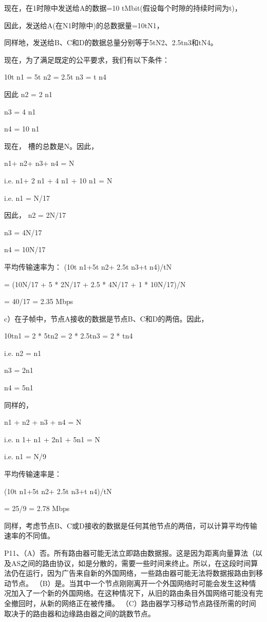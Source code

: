 \documentclass[11pt,UTF8,twoside]{article}
\begin{document}
{		现在，在1时隙中发送给A的数据=10 tMbit(假设每个时隙的持续时间为t)，
		
		因此，发送给A(在N1时隙中)的总数据量=10tN1，
		
		同样地，发送给B、C和D的数据总量分别等于5tN2、2.5tn3和tN4。
		
		现在，为了满足既定的公平要求，我们有以下条件：
		
		10t n1 = 5t n2 = 2.5t n3 = t n4 
		
		因此 
		n2 = 2 n1 
		
		n3 = 4 n1 
		
		n4 = 10 n1 
		
		现在， 槽的总数是N。因此， 
		
		n1+ n2+ n3+ n4 = N 
		
		i.e. n1+ 2 n1 + 4 n1 + 10 n1 = N 
		
		i.e. n1 = N/17 
		
		因此， 
		n2 = 2N/17 
		
		n3 = 4N/17 
		
		n4 = 10N/17 
		
		平均传输速率为： 
		(10t n1+5t n2+ 2.5t n3+t n4)/tN 
		
		= (10N/17 + 5 * 2N/17 + 2.5 * 4N/17 + 1 * 10N/17)/N 
		
		= 40/17 = 2.35 Mbps 
		
		c）在子帧中，节点A接收的数据是节点B、C和D的两倍。因此，
		
		10tn1 = 2 * 5tn2 = 2 * 2.5tn3 = 2 * tn4 
		
		i.e. n2 = n1 
		
		n3 = 2n1 
		
		n4 = 5n1 
		
		同样的， 
		
		n1 + n2 + n3 + n4 = N 
		
		i.e. n 1+ n1 + 2n1 + 5n1 = N 
		
		i.e. n1 = N/9 
		
		平均传输速率是： 
		
		(10t n1+5t n2+ 2.5t n3+t n4)/tN 
		
		= 25/9 = 2.78 Mbps 
		
		同样，考虑节点B、C或D接收的数据是任何其他节点的两倍，可以计算平均传输速率的不同值。
		
		P11、（A）否。所有路由器可能无法立即路由数据报。这是因为距离向量算法（以及AS之间的路由协议，如是分散的，需要一些时间来终止。所以，在这段时间算法仍在运行，因为广告来自新的外国网络，一些路由器可能无法将数据报路由到移动节点。
		（B）是。当其中一个节点刚刚离开一个外国网络时可能会发生这种情况加入了一个新的外国网络。在这种情况下，从旧的路由条目外国网络可能没有完全撤回时，从新的网络正在被传播。
		（C）路由器学习移动节点路径所需的时间取决于的路由器和边缘路由器之间的跳数节点。
		
}
\end{document}
